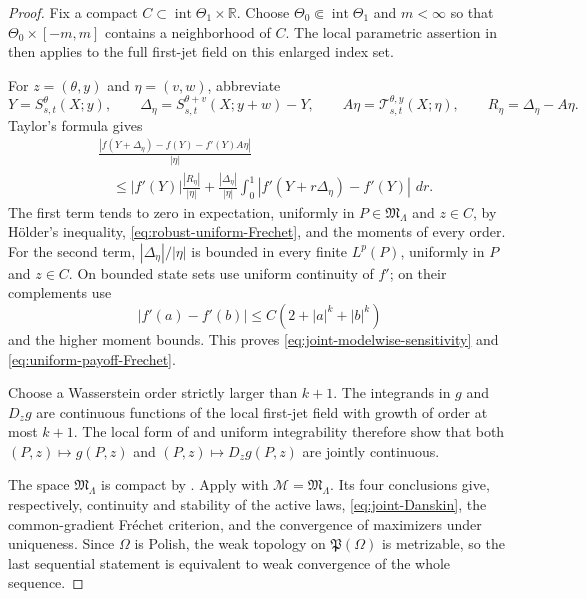\documentclass[11pt,reqno]{amsart}
\theoremstyle{plain}
\theoremstyle{definition}
\newcommand{\R}{\mathbb R}
\newcommand{\dd}{\,d}
\begin{document}
\begin{proof}
Fix a compact \(C\subset\operatorname{int}\Theta_1\times\R\).  Choose
\(\Theta_0\Subset\operatorname{int}\Theta_1\) and \(m<\infty\) so that
\(\Theta_0\times[-m,m]\) contains a neighborhood of \(C\).  The local
parametric assertion in  then applies to the
full first-jet field on this enlarged index set.

For \(z=(\theta,y)\) and \(\eta=(v,w)\), abbreviate
\[
  Y=S_{s,t}^\theta(X;y),\qquad
  \Delta_\eta=S_{s,t}^{\theta+v}(X;y+w)-Y,\qquad
  A\eta=\mathcal T_{s,t}^{\theta,y}(X;\eta),\qquad
  R_\eta=\Delta_\eta-A\eta.
\]
Taylor's formula gives
\begin{align*}
&\frac{|f(Y+\Delta_\eta)-f(Y)-f'(Y)A\eta|}{|\eta|}\\
&\quad\le
 |f'(Y)|\frac{|R_\eta|}{|\eta|}
 +\frac{|\Delta_\eta|}{|\eta|}
  \int_0^1|f'(Y+r\Delta_\eta)-f'(Y)|\,\dd r.
\end{align*}
The first term tends to zero in expectation, uniformly in
\(P\in\mathfrak M_\Lambda\) and \(z\in C\), by H\"older's inequality,
\eqref{eq:robust-uniform-Frechet}, and the moments of every order.  For the
second term, \(|\Delta_\eta|/|\eta|\) is bounded in every finite
\(L^p(P)\), uniformly in \(P\) and \(z\in C\).  On bounded state sets use
uniform continuity of \(f'\); on their complements use
\[
  |f'(a)-f'(b)|\le C(2+|a|^k+|b|^k)
\]
and the higher moment bounds.  This proves
\eqref{eq:joint-modelwise-sensitivity} and
\eqref{eq:uniform-payoff-Frechet}.

Choose a Wasserstein order strictly larger than \(k+1\).  The integrands in
\(g\) and \(D_zg\) are continuous functions of the local first-jet field
with growth of order at most \(k+1\).  The local form of
 and uniform integrability therefore show that
both \((P,z)\mapsto g(P,z)\) and
\((P,z)\mapsto D_zg(P,z)\) are jointly continuous.

The space \(\mathfrak M_\Lambda\) is compact by
.  Apply
 with
\(\mathcal M=\mathfrak M_\Lambda\).  Its four conclusions give,
respectively, continuity and stability of the active laws,
\eqref{eq:joint-Danskin}, the common-gradient Fr\'echet criterion, and the
convergence of maximizers under uniqueness.
Since \(\Omega\) is Polish, the weak topology on
\(\mathfrak P(\Omega)\) is metrizable, so the last sequential statement is
equivalent to weak convergence of the whole sequence.
\end{proof}
\end{document}
